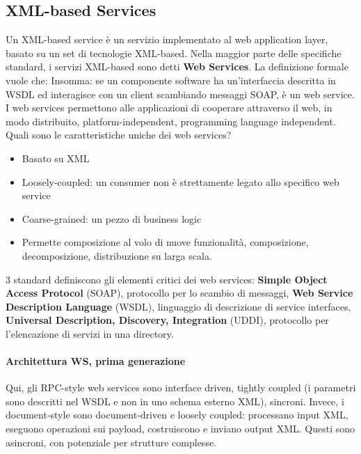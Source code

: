 \documentclass[11pt]{article}
\begin{document}
\subsection{XML-based Services}
Un XML-based service è un servizio implementato al web application layer, basato su un set di tecnologie XML-based. Nella maggior parte delle specifiche standard, i servizi XML-based sono detti \textbf{Web Services}.
La definizione formale vuole che: 
Insomma: se un componente software ha un'interfaccia descritta in WSDL ed interagisce con un client scambiando messaggi SOAP, è un web service. I web services permettono alle applicazioni di cooperare attraverso il web, in modo distribuito, platform-independent, programming language independent.
Quali sono le caratteristiche uniche dei web services?
\begin{itemize}
    \item Basato su XML
    \item Loosely-coupled: un consumer non è strettamente legato allo specifico web service 
    \item Coarse-grained: un pezzo di business logic 
    \item Permette composizione al volo di nuove funzionalità, composizione, decomposizione, distribuzione su larga scala.
\end{itemize}
3 standard definiscono gli elementi critici dei web services: \textbf{Simple Object Access Protocol} (SOAP), protocollo per lo scambio di messaggi, \textbf{Web Service Description Language} (WSDL), linguaggio di descrizione di service interfaces, \textbf{Universal Description, Discovery, Integration} (UDDI), protocollo per l'elencazione di servizi in una directory.
\paragraph{Architettura WS, prima generazione} Qui, gli RPC-style web services sono interface driven, tightly coupled (i parametri sono descritti nel WSDL e non in uno schema esterno XML), sincroni. Invece, i document-style sono document-driven e loosely coupled: processano input XML, eseguono operazioni sui payload, costruiscono e inviano output XML. Questi sono asincroni, con potenziale per strutture complesse. 
\end{document}
